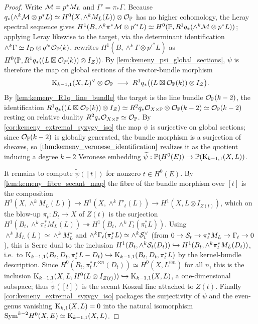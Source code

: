 \begin{proof}
  Write \(\mathcal{M}=p^*M_L\) and \(\Gamma'=\pi_*\Gamma\).  Because
  \(q_*(\wedge^k\mathcal{M}\otimes p^*L)\simeq H^0(X,\wedge^kM_L(L))\otimes\mathcal{O}_{\mathbb{P}}\) has no
  higher cohomology, the Leray spectral sequence gives
  \(H^1(B,\wedge^k\pi^*\mathcal{M}\otimes p'^*L)\simeq
   H^0(\mathbb{P},R^1q_*(\wedge^k\mathcal{M}\otimes p^*L))\); applying Leray likewise to the
  target, via the determinant identification
  \(\wedge^k\Gamma\simeq I_D\otimes q'^*\mathcal{O}_{\mathbb{P}}(k)\), rewrites
  \(H^1(B,\wedge^k\Gamma\otimes p'^*L)\) as
  \(H^0(\mathbb{P},R^1q_*((L\boxtimes\mathcal{O}_{\mathbb{P}}(k))\otimes I_{\mathcal{Z}}))\).  By
  \cref{lem:kemeny_psi_global_sections}, \(\psi\) is therefore the map on global
  sections of the vector-bundle morphism
  \[
    \mathrm{K}_{k-1,1}(X,L)^\vee\otimes\mathcal{O}_{\mathbb{P}}\;\longrightarrow\;
      R^1q_*\bigl((L\boxtimes\mathcal{O}_{\mathbb{P}}(k))\otimes I_{\mathcal{Z}}\bigr).
  \]
  By \cref{lem:kemeny_R1q_line_bundle} the target is the line bundle
  \(\mathcal{O}_{\mathbb{P}}(k-2)\), the identification
  \(R^1q_*((L\boxtimes\mathcal{O}_{\mathbb{P}}(k))\otimes I_{\mathcal{Z}})\simeq
    R^2q_*\mathcal{O}_{X\times\mathbb{P}}\otimes\mathcal{O}_{\mathbb{P}}(k-2)\simeq\mathcal{O}_{\mathbb{P}}(k-2)\) resting on
  relative duality \(R^2q_*\mathcal{O}_{X\times\mathbb{P}}\simeq\mathcal{O}_{\mathbb{P}}\).  By
  \cref{cor:kemeny_extremal_syzygy_iso} the map \(\psi\) is surjective on global
  sections; since \(\mathcal{O}_{\mathbb{P}}(k-2)\) is globally generated, the bundle morphism is
  a surjection of sheaves, so \(\cref{thm:kemeny_veronese_identification}\)
  realizes it as the quotient inducing a degree \(k-2\) Veronese embedding
  \(\widetilde\psi:\mathbb{P}(H^0(E))\to\mathbb{P}(\mathrm{K}_{k-1,1}(X,L))\).

  It remains to compute \(\widetilde\psi([t])\) for nonzero \(t\in H^0(E)\).  By
  \cref{lem:kemeny_fibre_secant_map} the fibre of the bundle morphism over
  \([t]\) is the composition
  \(H^1(X,\wedge^kM_L(L))\to H^1(X,\wedge^k\Gamma'_t(L))\to
   H^1(X,L\otimes I_{Z(t)})\), which on the blow-up \(\pi_t:B_t\to X\) of
  \(Z(t)\) is the surjection
  \(H^1(B_t,\wedge^k\pi_t^*M_L(L))\twoheadrightarrow
    H^1(B_t,\wedge^k\Gamma_t(\pi_t^*L))\).  Using
  \(\wedge^kM_L(L)\simeq\wedge^kM_L^\vee\) and
  \(\wedge^k\Gamma_t(\pi_t^*L)\simeq\wedge^k\mathcal{S}_t^\vee\) (from
  \(0\to\mathcal{S}_t\to\pi_t^*M_L\to\Gamma_t\to0\)), this is Serre dual to the inclusion
  \(H^1(B_t,\wedge^k\mathcal{S}_t(D_t))\hookrightarrow H^1(B_t,\wedge^k\pi_t^*M_L(D_t))\),
  i.e.\ to
  \(\mathrm{K}_{k-1,1}(B_t,D_t,\pi_t^*L-D_t)\hookrightarrow\mathrm{K}_{k-1,1}(B_t,D_t,\pi_t^*L)\)
  by the kernel-bundle description.  Since
  \(H^0(B_t,\pi_t^*L^{\otimes n}(D_t))\simeq H^0(X,L^{\otimes n})\) for all \(n\),
  this is the inclusion
  \(\mathrm{K}_{k-1,1}(X,L,H^0(L\otimes I_{Z(t)}))\hookrightarrow\mathrm{K}_{k-1,1}(X,L)\), a
  one-dimensional subspace; thus \(\widetilde\psi([t])\) is the secant Koszul line
  attached to \(Z(t)\).  Finally \cref{cor:kemeny_extremal_syzygy_iso} packages
  the surjectivity of \(\psi\) and the even-genus vanishing
  \(\mathrm{K}_{k,1}(X,L)=0\) into the natural isomorphism
  \(\mathrm{Sym}^{k-2}H^0(X,E)\simeq\mathrm{K}_{k-1,1}(X,L)\).
\end{proof}

